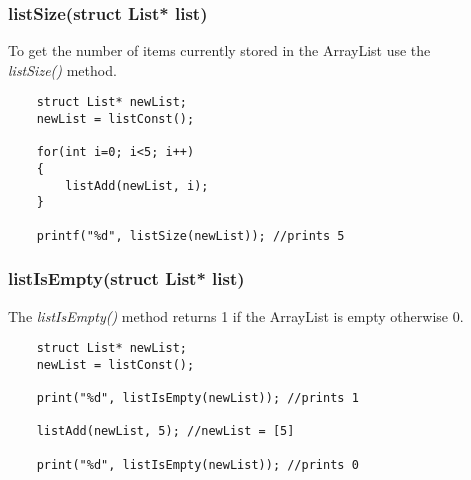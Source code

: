 \documentclass{article}
\begin{document}
\subsubsection*{listSize(struct List* list)}
To get the number of items currently stored in the ArrayList use the\\
\emph{listSize()} method.
\begin{lstlisting}
    struct List* newList;
    newList = listConst();

    for(int i=0; i<5; i++)
    {
        listAdd(newList, i);
    }

    printf("%d", listSize(newList)); //prints 5
\end{lstlisting}

\subsubsection*{listIsEmpty(struct List* list)}
The \emph{listIsEmpty()} method returns 1 if the ArrayList is empty otherwise 0.

\begin{lstlisting}
    struct List* newList;
    newList = listConst();

    print("%d", listIsEmpty(newList)); //prints 1

    listAdd(newList, 5); //newList = [5]

    print("%d", listIsEmpty(newList)); //prints 0
    
\end{lstlisting}
\end{document}
